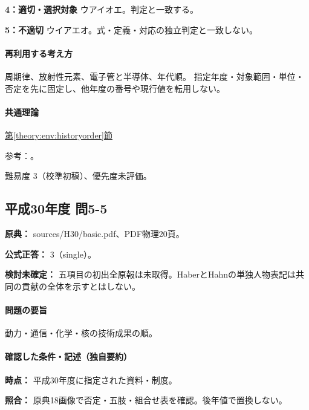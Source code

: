 \noindent\textbf{4：適切・選択対象} ウアイオエ。判定と一致する。\par

\noindent\textbf{5：不適切} ウイアエオ。式・定義・対応の独立判定と一致しない。\par

\paragraph{再利用する考え方} 周期律、放射性元素、電子管と半導体、年代順。 指定年度・対象範囲・単位・否定を先に固定し、他年度の番号や現行値を転用しない。

\paragraph{共通理論} \hyperref[theory:env:historyorder]{第\ref*{theory:env:historyorder}節}

\par 参考：\cite{env58_curie}。

\par 難易度 3（校準初稿）、優先度未評価。

\subsection{平成30年度 問5-5}
\label{q:h30-reg-basic-5-5}

\noindent\textbf{原典：} sources/H30/basic.pdf、PDF物理20頁。

\textbf{公式正答：} 3（single）。

\par\textbf{検討未確定：} 五項目の初出全原報は未取得。HaberとHahnの単独人物表記は共同の貢献の全体を示すとはしない。

\paragraph{問題の要旨} 動力・通信・化学・核の技術成果の順。

\paragraph{確認した条件・記述（独自要約）}\mbox{}\par

\noindent\textbf{時点：} 平成30年度に指定された資料・制度。\par

\noindent\textbf{照合：} 原典18画像で否定・五肢・組合せ表を確認。後年値で置換しない。\par

